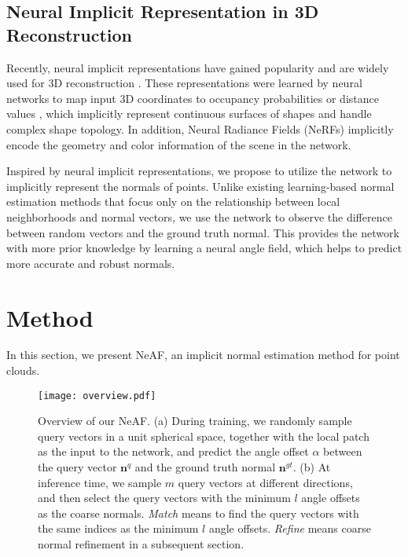 \documentclass[letterpaper]{article} \usepackage{aaai23}  \usepackage{times}  \usepackage{helvet}  \usepackage{courier}  \usepackage[hyphens]{url}  \usepackage{graphicx} \urlstyle{rm} \def\UrlFont{\rm}  \usepackage{natbib}  \usepackage{caption} \frenchspacing  \setlength{\pdfpagewidth}{8.5in} \setlength{\pdfpageheight}{11in} \usepackage{algorithm}
\begin{document}
\subsection{Neural Implicit Representation in 3D Reconstruction}
Recently, neural implicit representations have gained popularity and are widely used for 3D reconstruction \cite{Zhou2022CAP-UDF, On-SurfacePriors, LPI, PredictableContextPrior, Li2022DCCDIF}. These representations were learned by neural networks to map input 3D coordinates to occupancy probabilities \cite{chen2019learning, mescheder2019occupancy} or distance values \cite{MateuszMichalkiewicz2019ImplicitSR,JeongJoonPark2019DeepSDFLC}, which implicitly represent continuous surfaces of shapes and handle complex shape topology. In addition, Neural Radiance Fields (NeRFs) \cite{mildenhall2020nerf} implicitly encode the geometry and color information of the scene in the network.

Inspired by neural implicit representations, we propose to utilize the network to implicitly represent the normals of points. Unlike existing learning-based normal estimation methods that focus only on the relationship between local neighborhoods and normal vectors, we use the network to observe the difference between random vectors and the ground truth normal. This provides the network with more prior knowledge by learning a neural angle field, which helps to predict more accurate and robust normals.

\section{Method}
In this section, we present NeAF, an implicit normal estimation method for point clouds.

\begin{figure}[t]
\centering
\texttt{[image: overview.pdf]}
\caption{Overview of our NeAF. (a) During training, we randomly sample query vectors in a unit spherical space, together with the local patch as the input to the network, and predict the angle offset $\alpha$ between the query vector $\boldsymbol{n}^q$ and the ground truth normal $\boldsymbol{n}^{gt}$. (b) At inference time, we sample $m$ query vectors at different directions, and then select the query vectors with the minimum $l$ angle offsets as the coarse normals. \emph{Match} means to find the query vectors with the same indices as the minimum $l$ angle offsets. \emph{Refine} means coarse normal refinement in a subsequent section.}
\label{fig:overview}
\end{figure}
\end{document}
